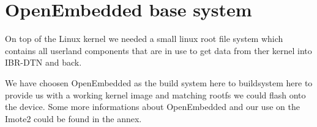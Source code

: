 \section{OpenEmbedded base system}
On top of the Linux kernel we needed a small linux root file system which
contains all userland components that are in use to get data from ther kernel
into IBR-DTN and back.

We have choosen OpenEmbedded as the build system here to buildsystem here to
provide us with a working kernel image and matching rootfs we could flash onto
the device. Some more informations about OpenEmbedded and our use on the Imote2
could be found in the annex.

